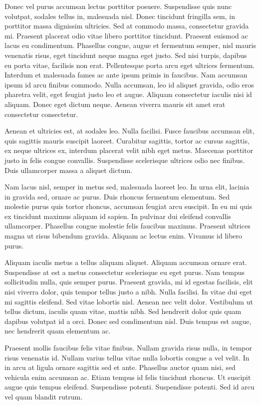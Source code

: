 \documentclass[10pt,openany]{book}
\begin{document}
Donec vel purus accumsan lectus porttitor posuere. Suspendisse quis nunc volutpat, sodales tellus in, malesuada nisl. Donec tincidunt fringilla sem, in porttitor massa dignissim ultricies. Sed at commodo massa, consectetur gravida mi. Praesent placerat odio vitae libero porttitor tincidunt. Praesent euismod ac lacus eu condimentum. Phasellus congue, augue et fermentum semper, nisl mauris venenatis risus, eget tincidunt neque magna eget justo. Sed nisi turpis, dapibus eu porta vitae, facilisis non erat. Pellentesque porta arcu eget ultrices fermentum. Interdum et malesuada fames ac ante ipsum primis in faucibus. Nam accumsan ipsum id arcu finibus commodo. Nulla accumsan, leo id aliquet gravida, odio eros pharetra velit, eget feugiat justo leo et augue. Aliquam consectetur iaculis nisi id aliquam. Donec eget dictum neque. Aenean viverra mauris sit amet erat consectetur consectetur.

Aenean et ultricies est, at sodales leo. Nulla facilisi. Fusce faucibus accumsan elit, quis sagittis mauris suscipit laoreet. Curabitur sagittis, tortor ac cursus sagittis, ex neque ultrices ex, interdum placerat velit nibh eget metus. Maecenas porttitor justo in felis congue convallis. Suspendisse scelerisque ultrices odio nec finibus. Duis ullamcorper massa a aliquet dictum.

Nam lacus nisl, semper in metus sed, malesuada laoreet leo. In urna elit, lacinia in gravida sed, ornare ac purus. Duis rhoncus fermentum elementum. Sed molestie purus quis tortor rhoncus, accumsan feugiat arcu suscipit. In eu mi quis ex tincidunt maximus aliquam id sapien. In pulvinar dui eleifend convallis ullamcorper. Phasellus congue molestie felis faucibus maximus. Praesent ultrices magna ut risus bibendum gravida. Aliquam ac lectus enim. Vivamus id libero purus.

Aliquam iaculis metus a tellus aliquam aliquet. Aliquam accumsan ornare erat. Suspendisse at est a metus consectetur scelerisque eu eget purus. Nam tempus sollicitudin nulla, quis semper purus. Praesent gravida, mi id egestas facilisis, elit nisi viverra dolor, quis tempor tellus justo a nibh. Nulla facilisi. In vitae dui eget mi sagittis eleifend. Sed vitae lobortis nisl. Aenean nec velit dolor. Vestibulum ut tellus dictum, iaculis quam vitae, mattis nibh. Sed hendrerit dolor quis quam dapibus volutpat id a orci. Donec sed condimentum nisl. Duis tempus est augue, nec hendrerit quam elementum ac.

Praesent mollis faucibus felis vitae finibus. Nullam gravida risus nulla, in tempor risus venenatis id. Nullam varius tellus vitae nulla lobortis congue a vel velit. In in arcu at ligula ornare sagittis sed et ante. Phasellus auctor quam nisi, sed vehicula enim accumsan ac. Etiam tempus id felis tincidunt rhoncus. Ut suscipit augue quis tempus eleifend. Suspendisse potenti. Suspendisse potenti. Sed id arcu vel quam blandit rutrum. 

\vfill

\theendnotes

\myendpage
\end{document}
